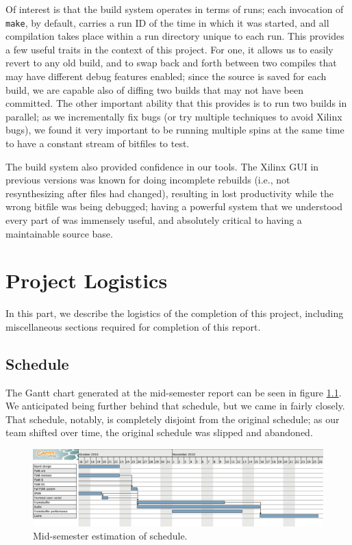 \documentclass[10pt]{report}
\begin{document}
Of interest is that the build system operates in terms of runs; each
invocation of \texttt{make}, by default, carries a run ID of the time in which it was
started, and all compilation takes place within a run directory unique to
each run. This provides a few useful traits in the context of this project.
For one, it allows us to easily revert to any old build, and to swap back
and forth between two compiles that may have different debug features
enabled; since the source is saved for each build, we are capable also of
diffing two builds that may not have been committed. The other important
ability that this provides is to run two builds in parallel; as we
incrementally fix bugs (or try multiple techniques to avoid Xilinx bugs), we
found it very important to be running multiple spins at the same time to
have a constant stream of bitfiles to test.

The build system also provided confidence in our tools. The Xilinx GUI in
previous versions was known for doing incomplete rebuilds (i.e., not
resynthesizing after files had changed), resulting in lost productivity
while the wrong bitfile was being debugged; having a powerful system that we
understood every part of was immensely useful, and absolutely critical to
having a maintainable source base.


\chapter{Project Logistics}

In this part, we describe the logistics of the completion of this project,
including miscellaneous sections required for completion of this report.

\section{Schedule}

The Gantt chart generated at the mid-semester report can be seen in figure
\ref{fig:gantt}.  We anticipated being further behind that schedule, but we
came in fairly closely.  That schedule, notably, is completely disjoint from
the original schedule; as our team shifted over time, the original schedule
was slipped and abandoned.

\begin{figure}
  \centering
    \includegraphics[width=\textwidth]{gantt-chart.png}
  \caption{Mid-semester estimation of schedule.} \label{fig:gantt}
\end{figure}
\end{document}
